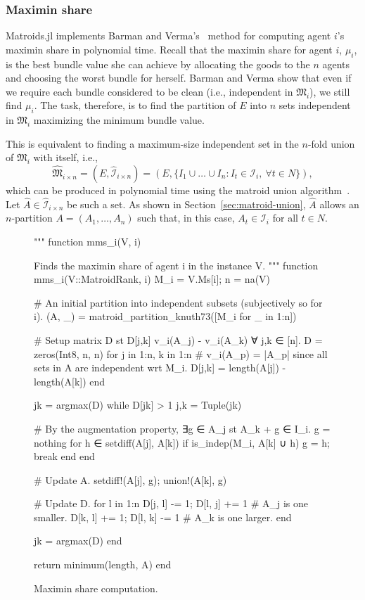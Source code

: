 \subsubsection*{Maximin share}
Matroids.jl implements Barman and Verma's~\cite[Appendix A]{barman2021existence} method for computing agent $i$'s maximin share in polynomial time. Recall that the maximin share for agent $i$,  $\mu_i$, is the best bundle value she can achieve by allocating the goods to the $n$ agents and choosing the worst bundle for herself. Barman and Verma show that even if we require each bundle considered to be clean (i.e., independent in $\mathfrak{M}_i$), we still find $\mu_i$. The task, therefore, is to find the partition of $E$ into $n$ sets independent in $\mathfrak{M}_i$ maximizing the minimum bundle value.

This is equivalent to finding a maximum-size independent set in the $n$-fold union of $\mathfrak{M}_i$ with itself, i.e.,
$$\widehat{\mathfrak{M}}_{i \times n} = (E, \widehat{\mathcal{I}}_{i\times n}) = (E, \{ I_1\cup\dots\cup I_n : I_t \in \mathcal{I}_i,\ \forall t \in N \}),$$ 
which can be produced in polynomial time using the matroid union algorithm~\cite[Ch. 42]{schrijver-2003}. Let $\widehat{A}\in\widehat{\mathcal{I}}_{i\times n}$ be such a set. As shown in Section~\ref{sec:matroid-union}, $\widehat{A}$ allows an $n$-partition $A = (A_1,\dots,A_n)$ such that, in this case, $A_t\in\mathcal{I}_i$ for all $t\in N$.

\begin{figure}
    \begin{jllisting}
"""
    function mms_i(V, i)

Finds the maximin share of agent i in the instance V.
"""
function mms_i(V::MatroidRank, i)
    M_i = V.Ms[i]; n = na(V)

    # An initial partition into independent subsets (subjectively so for i).
    (A, _) = matroid_partition_knuth73([M_i for _ in 1:n])

    # Setup matrix D st D[j,k] v_i(A_j) - v_i(A_k) ∀ j,k ∈ [n].
    D = zeros(Int8, n, n)
    for j in 1:n, k in 1:n
        # v_i(A_p) = |A_p| since all sets in A are independent wrt M_i.
        D[j,k] = length(A[j]) - length(A[k])
    end

    jk = argmax(D)
    while D[jk] > 1
        j,k = Tuple(jk)

        # By the augmentation property, ∃g ∈ A_j st A_k + g ∈ I_i.
        g = nothing
        for h ∈ setdiff(A[j], A[k]) 
            if is_indep(M_i, A[k] ∪ h)
                g = h; break
            end 
        end

        # Update A.
        setdiff!(A[j], g); union!(A[k], g)

        # Update D.
        for l in 1:n
            D[j, l] -= 1; D[l, j] += 1 # A_j is one smaller.
            D[k, l] += 1; D[l, k] -= 1 # A_k is one larger.
        end

        jk = argmax(D)
    end
    
    return minimum(length, A)
end
    \end{jllisting}
    \caption{Maximin share computation.}
    \label{code:mms_i}
\end{figure}

